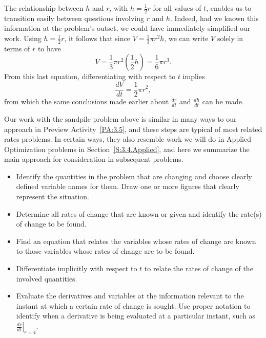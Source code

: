 The relationship between $h$ and $r$, with $h = \frac{1}{2}r$ for all values of $t$, enables us to transition easily between questions involving $r$ and $h$.  Indeed, had we known this information at the problem's outset, we could have immediately simplified our work.  Using $h = \frac{1}{2}r$, it follows that since $V = \frac{1}{3} \pi r^2 h$, we can write $V$ solely in terms of $r$ to have
$$V = \frac{1}{3} \pi r^2 \left(\frac{1}{2}h\right) = \frac{1}{6} \pi r^3.$$
From this last equation, differentiating with respect to $t$ implies
$$\frac{dV}{dt} = \frac{1}{2} \pi r^2,$$
from which the same conclusions made earlier about $\frac{dr}{dt}$ and $\frac{dh}{dt}$ can be made.

Our work with the sandpile problem above is similar in many ways to our approach in Preview Activity~\ref{PA:3.5}, and these steps are typical of most related rates problems.  In certain ways, they also resemble work we will do in Applied Optimization problems in Section~\ref{S:3.4.Applied}, and here we summarize the main approach for consideration in subsequent problems.
\begin{itemize}
\item Identify the quantities in the problem that are changing and choose clearly defined variable names for them.  Draw one or more figures that clearly represent the situation.
\item Determine all rates of change that are known or given and identify the rate(s) of change to be found.
\item Find an equation that relates the variables whose rates of change are known to those variables whose rates of change are to be found.
\item Differentiate implicitly with respect to $t$ to relate the rates of change of the involved quantities. 
\item Evaluate the derivatives and variables at the information relevant to the instant at which a certain rate of change is sought.  Use proper notation to identify when a derivative is being evaluated at a particular instant, such as $\left. \frac{dr}{dt} \right|_{r=4}$.
\end{itemize}

